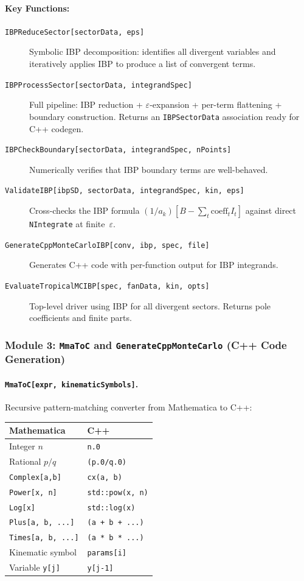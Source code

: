 \documentclass[11pt,a4paper]{article}
\begin{document}
\paragraph{Key Functions:}
\begin{description}
  \item[\texttt{IBPReduceSector[sectorData, eps]}] Symbolic IBP decomposition: identifies all divergent variables and iteratively applies IBP to produce a list of convergent terms.
  \item[\texttt{IBPProcessSector[sectorData, integrandSpec]}] Full pipeline: IBP reduction + $\varepsilon$-expansion + per-term flattening + boundary construction.  Returns an \texttt{IBPSectorData} association ready for C++ codegen.
  \item[\texttt{IBPCheckBoundary[sectorData, integrandSpec, nPoints]}] Numerically verifies that IBP boundary terms are well-behaved.
  \item[\texttt{ValidateIBP[ibpSD, sectorData, integrandSpec, kin, eps]}] Cross-checks the IBP formula $(1/a_k)[B - \sum_t\mathrm{coeff}_t I_t]$ against direct \texttt{NIntegrate} at finite~$\varepsilon$.
  \item[\texttt{GenerateCppMonteCarloIBP[conv, ibp, spec, file]}] Generates C++ code with per-function output for IBP integrands.
  \item[\texttt{EvaluateTropicalMCIBP[spec, fanData, kin, opts]}] Top-level driver using IBP for all divergent sectors.  Returns pole coefficients and finite parts.
\end{description}

\subsubsection{Module 3: \texttt{MmaToC} and \texttt{GenerateCppMonteCarlo} (C++ Code Generation)}

\paragraph{\texttt{MmaToC[expr, kinematicSymbols]}.} Recursive pattern-matching converter from Mathematica to C++:

\begin{center}
\begin{tabular}{ll}
\toprule
\textbf{Mathematica} & \textbf{C++} \\
\midrule
Integer $n$ & \texttt{n.0} \\
Rational $p/q$ & \texttt{(p.0/q.0)} \\
\texttt{Complex[a,b]} & \texttt{cx(a, b)} \\
\texttt{Power[x, n]} & \texttt{std::pow(x, n)} \\
\texttt{Log[x]} & \texttt{std::log(x)} \\
\texttt{Plus[a, b, ...]} & \texttt{(a + b + ...)} \\
\texttt{Times[a, b, ...]} & \texttt{(a * b * ...)} \\
Kinematic symbol & \texttt{params[i]} \\
Variable \texttt{y[j]} & \texttt{y[j-1]} \\
\bottomrule
\end{tabular}
\end{center}
\end{document}
